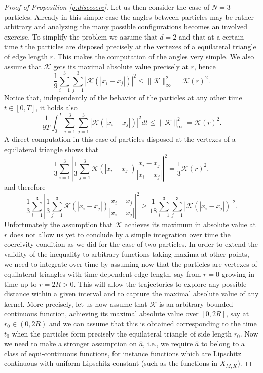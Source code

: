 \documentclass[A4paper,11pt]{article}
\theoremstyle{definition}
\begin{document}
\begin{proof}[Proof of Proposition \ref{p:disccoerc}]
Let us then consider the case of $N=3$ particles. Already in this simple case the angles between particles may be rather arbitrary and analyzing the many possible configurations becomes an involved exercise. 
To simplify the problem we assume that $d=2$  and that at a certain time $t$ the particles are disposed precisely at the vertexes of a equilateral triangle of edge length $r$. This makes the computation of the angles very simple. We also assume that $\mathcal K$ gets its maximal absolute value precisely at $r$, hence
$$
\frac{1}{9}   \sum_{i=1}^3 \sum_{j=1}^3 |\mathcal K(|x_i-x_j|)|^2  \leq \|\mathcal K\|_\infty^2 = \mathcal K(r)^2.
$$
Notice that, independently of the behavior of the particles at any other time $t \in [0,T]$, it holds also
\begin{equation}
\label{maxbound}
\frac{1}{9 T} \int_0^T  \sum_{i=1}^3 \sum_{j=1}^3 |\mathcal K(|x_i-x_j|)|^2  dt \leq \|\mathcal K\|_\infty^2 = \mathcal K(r)^2.
\end{equation}
A direct computation in this case of particles disposed at the vertexes of a equilateral triangle shows that 
$$
 \frac{1}{3} \sum_{i=1}^3 \left | \frac{1}{3} \sum_{j=1}^3 \mathcal K(|x_i-x_j|) \frac{x_i-x_j}{|x_i-x_j|} \right |^2 =\frac{1}{3}  \mathcal K(r)^2,
$$
and therefore
$$ 
\frac{1}{3} \sum_{i=1}^3 \left | \frac{1}{3} \sum_{j=1}^3 \mathcal K(|x_i-x_j|) \frac{x_i-x_j}{|x_i-x_j|} \right |^2 \geq \frac{1}{18}   \sum_{i=1}^3 \sum_{j=1}^3 |\mathcal K(|x_i-x_j|)|^2.
$$
Unfortunately the assumption that $\mathcal K$ achieves its maximum in absolute value at $r$ does not  allow us yet to conclude by a simple integration over time the coercivity condition as we did for the case of two particles. In order to extend the validity of the inequality to arbitrary functions taking maxima at other points, we need to integrate over time by assuming now that the particles are vertexes of equilateral triangles with time dependent edge length, say from $r=0$ growing in time up to $r=2 R>0$. This will allow the trajectories to explore any possible distance within a given interval and to capture the maximal absolute value of  any kernel. More precisely, let us now assume that $\mathcal K$ is an arbitrary bounded continuous function,  achieving its maximal absolute value over $[0,2R]$, say at $r_0 \in (0,2R)$ and we can assume that this is obtained corresponding to the time $t_0$ when the particles form precisely the equilateral triangle of side length $r_0$. Now we need to make a stronger assumption on $\widehat a$, i.e., we require $\widehat a$ to belong to a class of equi-continuous functions, for instance functions which are Lipschitz continuous with uniform Lipschitz constant (such as the functions in $X_{M,K}$).

\end{proof}
\end{document}
